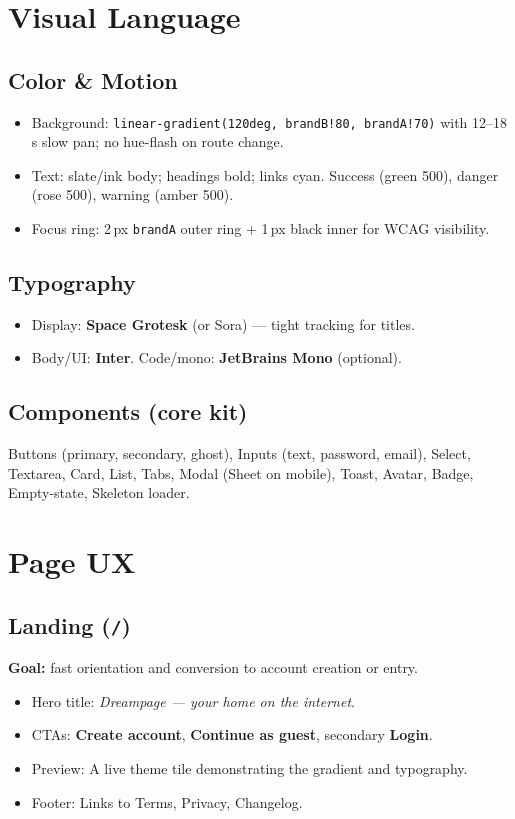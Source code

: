 \documentclass[11pt]{article}
\begin{document}
\section{Visual Language}
\subsection{Color \& Motion}
\begin{itemize}
  \item Background: \texttt{linear-gradient(120deg, brandB!80, brandA!70)} with 12--18\,s slow pan; no hue-flash on route change.
  \item Text: slate/ink body; headings bold; links cyan. Success (green 500), danger (rose 500), warning (amber 500).
  \item Focus ring: 2\,px \texttt{brandA} outer ring + 1\,px black inner for WCAG visibility.
\end{itemize}

\subsection{Typography}
\begin{itemize}
  \item Display: \textbf{Space Grotesk} (or Sora) --- tight tracking for titles.
  \item Body/UI: \textbf{Inter}. Code/mono: \textbf{JetBrains Mono} (optional).
\end{itemize}

\subsection{Components (core kit)}
Buttons (primary, secondary, ghost), Inputs (text, password, email), Select, Textarea, Card, List, Tabs, Modal (Sheet on mobile), Toast, Avatar, Badge, Empty-state, Skeleton loader.

\section{Page UX}

\subsection{Landing (\texttt{/})}
\textbf{Goal:} fast orientation and conversion to account creation or entry.
\begin{itemize}
  \item Hero title: \emph{Dreampage --- your home on the internet}.
  \item CTAs: \textbf{Create account}, \textbf{Continue as guest}, secondary \textbf{Login}.
  \item Preview: A live theme tile demonstrating the gradient and typography.
  \item Footer: Links to Terms, Privacy, Changelog.
\end{itemize}
\end{document}
